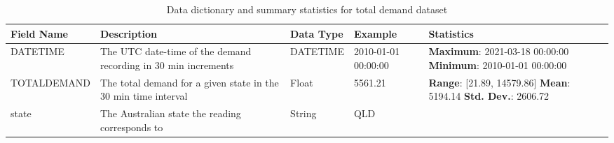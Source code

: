 \begin{table}
\centering
\setlength{\tabcolsep}{4pt} %
\renewcommand{\arraystretch}{1.5}  %
\small %
\begin{tabular}{@{}lp{6.3cm}llp{6.2cm}@{}} %
\toprule
Field Name & Description & Data Type & Example & Statistics \\
\midrule
DATETIME & The UTC date-time of the demand recording in 30 min increments & DATETIME & 2010-01-01 00:00:00& 
\textbf{Maximum}: 2021-03-18 00:00:00\newline
\textbf{Minimum}: 2010-01-01 00:00:00 \\

TOTALDEMAND & The total demand for a given state in the 30 min time interval & Float & 5561.21 & 
\textbf{Range}: [21.89, 14579.86]\newline
\textbf{Mean}: 5194.14\newline
\textbf{Std. Dev.}: 2606.72 \\

state & The Australian state the reading corresponds to & String & QLD &  \\
\bottomrule
\end{tabular}
\caption{Data dictionary and summary statistics for total demand dataset}
\label{tdemand-dict}
\end{table}